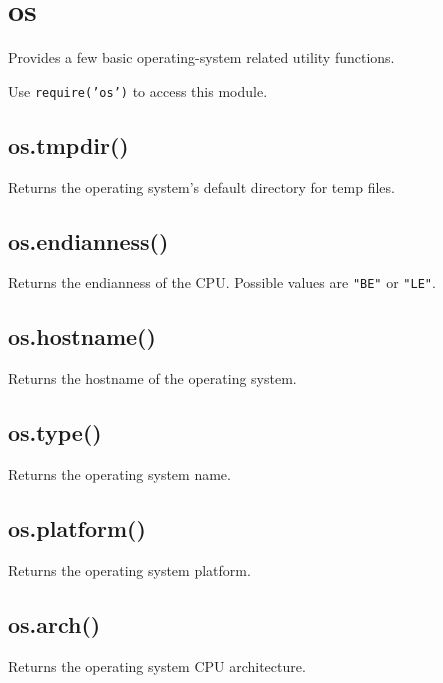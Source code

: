 \section{os}

\begin{Shaded}
\begin{Highlighting}[]
\NormalTok{: } 
\end{Highlighting}
\end{Shaded}

Provides a few basic operating-system related utility functions.

Use \texttt{require('os')} to access this module.

\subsection{os.tmpdir()}

Returns the operating system's default directory for temp files.

\subsection{os.endianness()}

Returns the endianness of the CPU. Possible values are \texttt{"BE"} or
\texttt{"LE"}.

\subsection{os.hostname()}

Returns the hostname of the operating system.

\subsection{os.type()}

Returns the operating system name.

\subsection{os.platform()}

Returns the operating system platform.

\subsection{os.arch()}

Returns the operating system CPU architecture.

